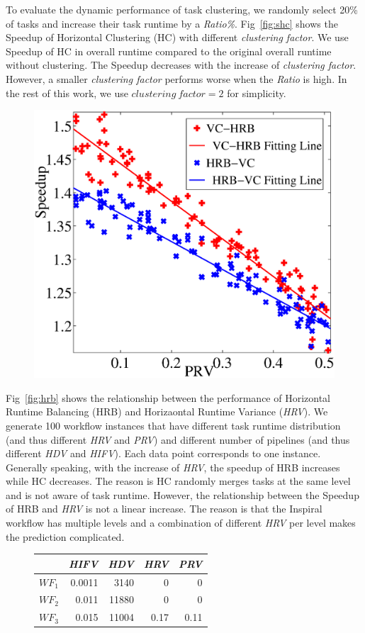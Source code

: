 To evaluate the dynamic performance of task clustering, we randomly select 20\% of tasks and increase their task runtime by a {\em Ratio\%}. Fig~\ref{fig:shc} shows the Speedup of Horizontal Clustering (HC) with different {\em clustering factor}. We use Speedup of HC in overall runtime compared to the original overall runtime without clustering. The Speedup decreases with the increase of {\em clustering factor}. However, a smaller {\em clustering factor} performs worse when the {\em Ratio} is high. In the rest of this work, we use $clustering~factor=2$ for simplicity. 

\begin{figure}
\centering
  \includegraphics[width=0.5\linewidth]{figures/balance/PRV-VC-figure_2.eps}
  \label{fig:hvc}
\end{figure}



Fig~\ref{fig:hrb} shows the relationship between the performance of Horizontal Runtime Balancing (HRB) and Horizaontal Runtime Variance ({\em HRV}). We generate 100 workflow instances that have different task runtime distribution (and thus different {\em HRV} and {\em PRV}) and different number of pipelines (and thus different {\em HDV} and {\em HIFV}). Each data point corresponds to one instance. Generally speaking, with the increase of {\em HRV}, the speedup of HRB increases while HC decreases. The reason is HC randomly merges tasks at the same level and is not aware of task runtime. However, the relationship between the Speedup of HRB and {\em HRV} is not a linear increase. The reason is that the Inspiral workflow has multiple levels and a combination of different {\em HRV} per level makes the prediction complicated. 






\begin{figure}
\centering
\begin{tabular}{l|r|r|r|r}
\hline
 & {\em HIFV} & {\em HDV} & {\em HRV} & {\em PRV} \\
\hline
$WF_1$ & 0.0011 & 3140 & 0 & 0\\
$WF_2$ & 0.011 & 11880 & 0  & 0\\
$WF_3$ & 0.015 & 11004 & 0.17 & 0.11\\
\end{tabular}
  \label{tab:3}
\end{figure}

